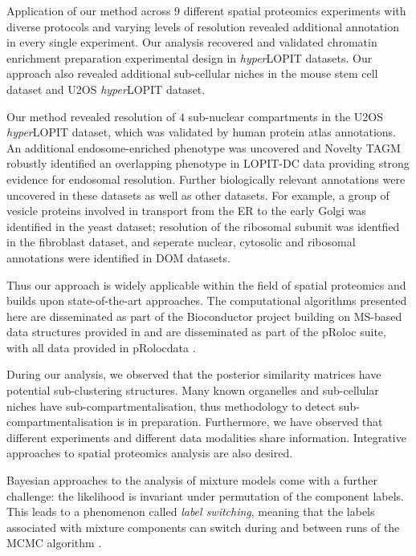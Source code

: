 \documentclass[12pt,english]{article}
\begin{document}
Application of our method across $9$ different spatial proteomics experiments with diverse protocols and varying levels of resolution revealed additional annotation in every single experiment. Our analysis recovered and validated chromatin enrichment preparation experimental design in \textit{hyper}LOPIT datasets. Our approach also revealed additional sub-cellular niches in the mouse stem cell dataset and U2OS \textit{hyper}LOPIT dataset.

Our method revealed resolution of $4$ sub-nuclear compartments in the U2OS \textit{hyper}LOPIT dataset, which was validated by human protein atlas annotations. An additional endosome-enriched phenotype was uncovered and Novelty TAGM robustly identified an overlapping phenotype in LOPIT-DC data providing strong evidence for endosomal resolution. Further biologically relevant annotations were uncovered in these datasets as well as other datasets. For example, a group of vesicle proteins involved in transport from the ER to the early Golgi was identified in the yeast dataset; resolution of the ribosomal subunit was identfied in the fibroblast dataset, and seperate nuclear, cytosolic and ribosomal annotations were identified in DOM datasets.

Thus our approach is widely applicable within the field of spatial proteomics and builds upon state-of-the-art approaches. The computational algorithms presented here are disseminated as part of the Bioconductor project \citep{Bioconductor::2004, Huber:2015} building on MS-based data structures provided in \cite{MSnbase:2012} and are disseminated as part of the pRoloc suite, with all data provided in pRolocdata \citep{pRoloc:2014}.

During our analysis, we observed that the posterior similarity matrices have potential sub-clustering structures. Many known organelles and sub-cellular niches have sub-compartmentalisation, thus methodology to detect sub-compartmentalisation is in preparation. Furthermore, we have observed that different experiments and different data modalities share information. Integrative approaches to spatial proteomics analysis are also desired. 

\appendix
Bayesian approaches to the analysis of mixture models come with a further challenge: the likelihood is invariant under permutation of the component labels. This leads to a phenomenon called \textit{label switching}, meaning that the labels associated with mixture components can switch during and between runs of the MCMC algorithm \citep{Richardson::1997}. 

\clearpage


\end{document}
